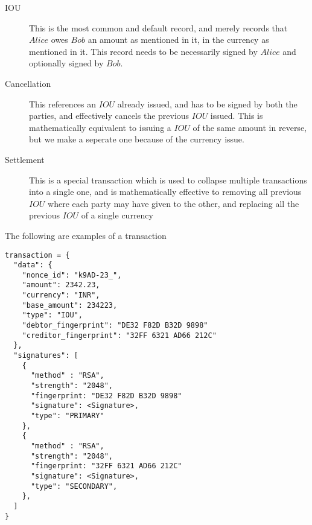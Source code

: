\documentclass[12pt,a4paper]{article}
\begin{document}
\begin{description}
\item [IOU] This is the most common and default record, and merely records that $Alice$ owes $Bob$ an amount as mentioned in it, in the currency as mentioned in it. This record needs to be necessarily signed by $Alice$ and optionally signed by $Bob$.

\item [Cancellation] This references an $IOU$ already issued, and has to be signed by both the parties, and effectively cancels the previous $IOU$ issued. This is mathematically equivalent to issuing a $IOU$ of the same amount in reverse, but we make a seperate one because of the currency issue.
\item [Settlement] This is a special transaction which is used to collapse multiple transactions into a single one, and is mathematically effective to removing all previous $IOU$ where each party may have given to the other, and replacing all the previous $IOU$ of a single currency

\end{description}

The following are examples of a transaction

\begin{verbatim}
transaction = {
  "data": {
    "nonce_id": "k9AD-23_",    
    "amount": 2342.23,
    "currency": "INR",
    "base_amount": 234223,
    "type": "IOU",
    "debtor_fingerprint": "DE32 F82D B32D 9898"
    "creditor_fingerprint": "32FF 6321 AD66 212C"
  },
  "signatures": [
    {
      "method" : "RSA",
      "strength": "2048",
      "fingerprint: "DE32 F82D B32D 9898"
      "signature": <Signature>,
      "type": "PRIMARY"
    },
    {
      "method" : "RSA",
      "strength": "2048",
      "fingerprint: "32FF 6321 AD66 212C"
      "signature": <Signature>,
      "type": "SECONDARY",
    },
  ]
}
\end{verbatim}
\end{document}
